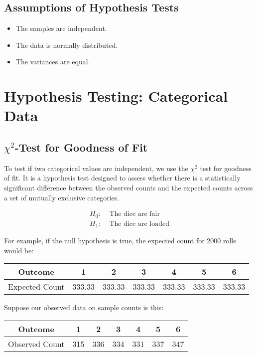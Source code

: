 \documentclass{article}
\theoremstyle{definition}
\theoremstyle{theorem}
\theoremstyle{theorem}
\theoremstyle{theorem}
\theoremstyle{theorem}
\theoremstyle{definition}
\theoremstyle{definition}
\theoremstyle{definition}
\theoremstyle{definition}
\theoremstyle{definition}
\begin{document}
\subsection{Assumptions of Hypothesis Tests}

\begin{itemize}
    \item The samples are independent.
    \item The data is normally distributed.
    \item The variances are equal.
\end{itemize}

\section{Hypothesis Testing: Categorical Data}

\subsection{\(\chi^2\)-Test for Goodness of Fit}
To test if two categorical values are independent, we use the \(\chi^2\) test for goodness of fit. It is a hypothesis test designed to assess whether there is a statistically significant difference between the observed counts and the expected counts across a set of mutually exclusive categories.

\begin{align*}
    H_0: & \text{ The dice are fair} \\
    H_1: & \text{ The dice are loaded}
\end{align*}

For example, if the null hypothesis is true, the expected count for 2000 rolls would be:

\begin{center}
\begin{tabular}{c|cccccc}
Outcome & 1 & 2 & 3 & 4 & 5 & 6 \\
\hline
Expected Count & 333.33 & 333.33 & 333.33 & 333.33 & 333.33 & 333.33 \\
\end{tabular}
\end{center}

Suppose our observed data on sample counts is this:

\begin{center}
\begin{tabular}{c|cccccc}
Outcome & 1 & 2 & 3 & 4 & 5 & 6 \\
\hline
Observed Count & 315 & 336 & 334 & 331 & 337 & 347 \\
\end{tabular}
\end{center}
\end{document}
